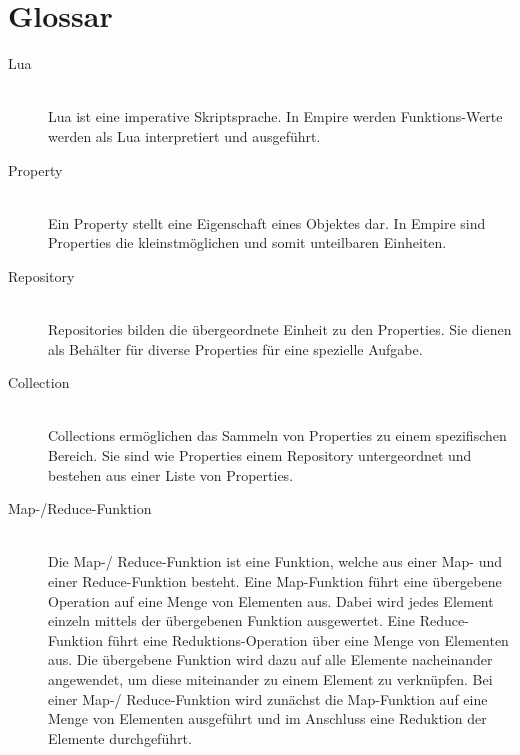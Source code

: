 
\section{Glossar}

\begin{description}
  \item[Lua] \hfill \\
  Lua ist eine imperative Skriptsprache. In Empire werden Funktions-Werte werden als Lua interpretiert und ausgeführt.
  \item[Property] \hfill \\
  Ein Property stellt eine Eigenschaft eines Objektes dar. In Empire sind Properties die kleinstmöglichen und somit unteilbaren Einheiten.
  \item[Repository] \hfill \\
  Repositories bilden die übergeordnete Einheit zu den Properties. Sie dienen als Behälter für diverse Properties für eine spezielle Aufgabe.
  \item[Collection] \hfill \\
  Collections ermöglichen das Sammeln von Properties zu einem spezifischen Bereich. Sie sind wie Properties einem Repository untergeordnet und bestehen aus einer Liste von Properties.
  \item[Map-/Reduce-Funktion] \hfill \\
  Die Map-/ Reduce-Funktion ist eine Funktion, welche aus einer Map- und einer Reduce-Funktion besteht. Eine Map-Funktion führt eine übergebene Operation auf eine Menge von Elementen aus. Dabei wird jedes Element einzeln mittels der übergebenen Funktion ausgewertet. Eine Reduce-Funktion führt eine Reduktions-Operation über eine Menge von Elementen aus. Die übergebene Funktion wird dazu auf alle Elemente nacheinander angewendet, um diese miteinander zu einem Element zu verknüpfen. Bei einer Map-/ Reduce-Funktion wird zunächst die Map-Funktion auf eine Menge von Elementen ausgeführt und im Anschluss eine Reduktion der Elemente durchgeführt.
\end{description}
